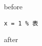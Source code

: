 \documentclass{article}
\begin{document}
before
\begin{verbatim}
x = 1 % 表
\end{verbatim}
after
\end{document}
